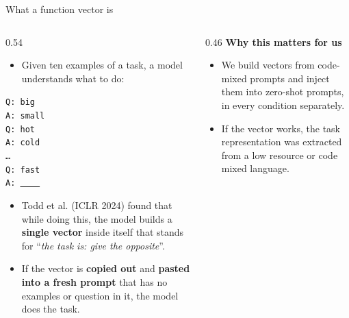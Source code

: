 \documentclass[aspectratio=169,11pt]{beamer}
\newcommand{\tight}{\setlength{\itemsep}{2pt plus 1pt minus 1pt}}
\begin{document}
\begin{frame}{What a function vector is}
  \begin{columns}[T]
    \begin{column}{0.54\textwidth}
      \begin{itemize}\small\tight
        \item Given ten examples of a task, a model understands what to do:
      \end{itemize}
      {\footnotesize\texttt{Q: big \\ A: small \\[1mm] Q: hot \\ A: cold \\[1mm]
        \ldots \\[1mm] Q: fast \\ A: \underline{\ \ \ \ }}}
      \begin{itemize}\small\tight
        \item Todd et al. (ICLR 2024) found that while doing this, the model
              builds a \textbf{single vector} inside itself that stands for
              ``\emph{the task is: give the opposite}''.
        \item If the vector is \textbf{copied out} and \textbf{pasted into
              a fresh prompt} that has no examples or question in it, the model does
              the task.
      \end{itemize}
    \end{column}
    \begin{column}{0.46\textwidth}
      \vspace{2mm}
      \textbf{Why this matters for us}
      \vspace{1mm}
      \begin{itemize}\footnotesize\tight
        \item We build vectors from code-mixed prompts and inject them into
              zero-shot prompts, in every condition separately.
        \item If the vector works, the task representation was extracted from a low resource or code mixed language.
      \end{itemize}
    \end{column}
  \end{columns}
\end{frame}
\end{document}
